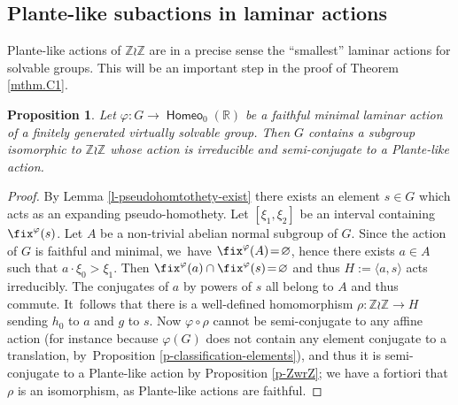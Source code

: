 \documentclass[JEP,XML,SOM,Unicode,NoFloatCountersInSection,published]{cedram}
\newtheorem{prop}[thm]{Proposition}
\theoremstyle{definition}
\DeclareMathOperator{\homeo}{\mathsf{Homeo}}
\newcommand{\R}{\mathbb{R}}
\newcommand{\Z}{\mathbb Z}
\begin{document}
\subsection{Plante-like subactions in laminar actions}

Plante-like actions of $\Z \wr \Z$ are in a precise sense the ``smallest'' laminar actions for solvable groups. This will be an important step in the proof of Theorem \ref{mthm.C1}.
\begin{prop} \label{p-plante-ubiquitous}
Let $\varphi\colon G\to \homeo_0(\R)$ be a faithful minimal laminar action of a finitely generated virtually solvable group. Then $G$ contains a subgroup isomorphic to $\Z \wr \Z$ whose action is irreducible and semi-conjugate to a Plante-like action.
\end{prop}

\begin{proof}
By Lemma \ref{l-pseudohomtothety-exist} there exists an element $s\in G$ which acts as an expanding pseudo-homothety. Let $[\xi_1, \xi_2]$ be an interval containing $\fix^{\varphi}(s)$. Let $A$ be a non-trivial abelian normal subgroup of $G$. Since the action of $G$ is faithful and minimal, we~have $\fix^\varphi(A)\!=\!\varnothing$, hence there exists $a\in A$ such that $a\cdot\xi_0>\xi_1$. Then \hbox{$\fix^\varphi(a)\cap \fix^\varphi(s)\!=\!\varnothing$} and thus $H:=\langle a, s\rangle$ acts irreducibly. The conjugates of $a$ by powers of $s$ all belong to $A$ and thus commute. It~follows that there is a well-defined homomorphism \hbox{$\rho\colon \Z\wr \Z\to H$} sending $h_0$ to $a$ and $g$ to $s$. Now $\varphi\circ \rho$ cannot be semi-conjugate to any affine action (for instance because $\varphi(G)$ does not contain any element conjugate to a translation, by~Proposition \ref{p-classification-elements}), and thus it is semi-conjugate to a Plante-like action by Proposition \ref{p-ZwrZ}; we have a fortiori that $\rho$ is an isomorphism, as Plante-like actions are faithful. \qedhere
\end{proof}
\end{document}

